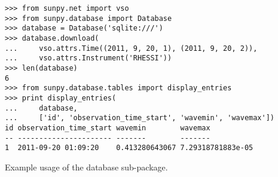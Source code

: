 \begin{listing}[H]
\begin{verbatim}
>>> from sunpy.net import vso
>>> from sunpy.database import Database
>>> database = Database('sqlite:///')
>>> database.download(
...     vso.attrs.Time((2011, 9, 20, 1), (2011, 9, 20, 2)),
...     vso.attrs.Instrument('RHESSI'))
>>> len(database)
6
>>> from sunpy.database.tables import display_entries
>>> print display_entries(
...     database,
...     ['id', 'observation_time_start', 'wavemin', 'wavemax'])
id observation_time_start wavemin        wavemax    
-- ---------------------- -------        -------    
1  2011-09-20 01:09:20    0.413280643067 7.29318781883e-05

\end{verbatim}
\caption{Example usage of the database sub-package.}
\label{code:database}
\end{listing}
